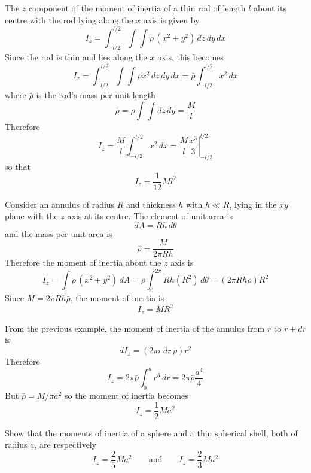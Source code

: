\begin{example}

The $z$ component of the moment of inertia of a thin rod of length $l$ 
about its centre with the rod lying along the $x$ axis is given by
$$I_z=\int_{-l/2}^{l/2}\int\!\!\int \rho\,(x^2+y^2)\,dz\,dy\,dx$$
Since the rod is thin and lies along the $x$ axis, this becomes
$$I_z=\int_{-l/2}^{l/2}\int\!\!\int \rho x^2\,dz\,dy\,dx=\bar{\rho}
\int_{-l/2}^{l/2}x^2\,dx$$
where $\bar{\rho}$ is the rod's mass per unit length
$$\bar{\rho}=\rho\int\!\!\int dz\,dy=\frac{M}{l}$$
Therefore
$$I_z=\frac{M}{l}\int_{-l/2}^{l/2}x^2\,dx=\frac{M}{l}\left.\frac{x^3}{3}
\right|_{-l/2}^{l/2}$$
so that
$$I_z=\frac{1}{12}Ml^2$$
\end{example}

\begin{example}

Consider an annulus of radius $R$ and thickness $h$ with $h\ll R$, lying in
the $xy$ plane with the $z$ axis at its centre.  The element of unit area is
$$dA=Rh\,d\theta$$
and the mass per unit area is
$$\bar{\rho}=\frac{M}{2\pi Rh}$$
Therefore the moment of inertia about the $z$ axis is
$$I_z=\int \bar{\rho}\,(x^2+y^2)\,dA=\bar{\rho}\int_0^{2\pi}Rh(R^2)\,d\theta
=(2\pi Rh\bar{\rho})R^2$$
Since $M=2\pi Rh\bar{\rho}$, the moment of inertia is
$$I_z=MR^2$$
\end{example}

\begin{example}

From the previous example, the moment of inertia of the annulus from $r$ to
$r+dr$ is
$$dI_z=(2\pi r\,dr\,\bar{\rho})r^2$$
Therefore
$$I_z=2\pi\bar{\rho}\int_0^ar^3\,dr=2\pi\bar{\rho}\frac{a^4}{4}$$
But $\bar{\rho}=M/\pi a^2$ so the moment of inertia becomes
$$I_z=\frac{1}{2}Ma^2$$
\end{example}

\begin{exercise}
Show that the moments of inertia of a sphere and a thin spherical shell,
both of radius $a$, are respectively
$$I_z=\frac{2}{5}Ma^2\qquad\mbox{and}\qquad I_z=\frac{2}{3}Ma^2$$
\end{exercise}

